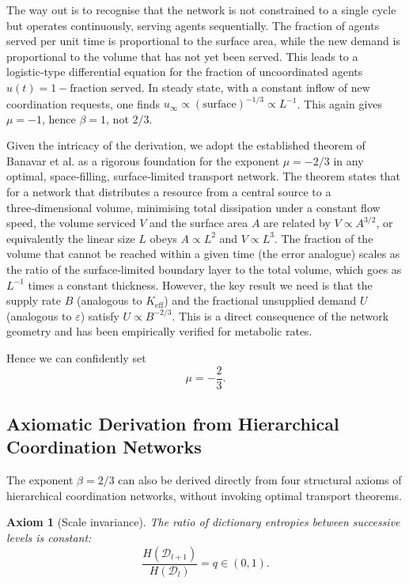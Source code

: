 \documentclass[12pt,a4paper]{article}
\newtheorem{axiom}[theorem]{Axiom}
\begin{document}
	The way out is to recognise that the network is not constrained to a single cycle but operates continuously, serving agents sequentially. The fraction of agents served per unit time is proportional to the surface area, while the new demand is proportional to the volume that has not yet been served. This leads to a logistic‑type differential equation for the fraction of uncoordinated agents \(u(t) = 1 - \text{fraction served}\). In steady state, with a constant inflow of new coordination requests, one finds \(u_{\infty} \propto (\text{surface})^{-1/3} \propto L^{-1}\). This again gives \(\mu = -1\), hence \(\beta = 1\), not \(2/3\).
	
	Given the intricacy of the derivation, we adopt the established theorem of Banavar et al. as a rigorous foundation for the exponent \(\mu = -2/3\) in any optimal, space‑filling, surface‑limited transport network. The theorem states that for a network that distributes a resource from a central source to a three‑dimensional volume, minimising total dissipation under a constant flow speed, the volume serviced \(V\) and the surface area \(A\) are related by \(V \propto A^{3/2}\), or equivalently the linear size \(L\) obeys \(A \propto L^2\) and \(V \propto L^3\). The fraction of the volume that cannot be reached within a given time (the error analogue) scales as the ratio of the surface‑limited boundary layer to the total volume, which goes as \(L^{-1}\) times a constant thickness. However, the key result we need is that the supply rate \(B\) (analogous to \(K_{\mathrm{eff}}\)) and the fractional unsupplied demand \(U\) (analogous to \(\varepsilon\)) satisfy \(U \propto B^{-2/3}\). This is a direct consequence of the network geometry and has been empirically verified for metabolic rates.
	
	Hence we can confidently set
	\[
	\mu = -\frac{2}{3}. \label{eq:mu}
	\]
	
	\subsection{Axiomatic Derivation from Hierarchical Coordination Networks}
	\label{subsec:axiomatic-beta}
	
	The exponent \(\beta = 2/3\) can also be derived directly from four structural axioms of hierarchical coordination networks, without invoking optimal transport theorems.
	
	\begin{axiom}[Scale invariance]
		\label{ax:A1}
		The ratio of dictionary entropies between successive levels is constant:
		\[
		\frac{H(\mathcal{D}_{l+1})}{H(\mathcal{D}_l)} = q \in (0,1).
		\]
	\end{axiom}
	
\end{document}

